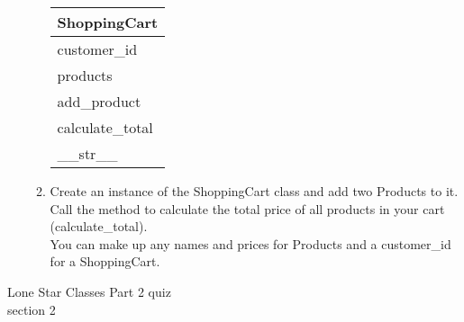 \documentclass{article}
\begin{document}
\begin{enumerate}
\begin{enumerate}
			\begin{flushright}
			\begin{tabular}{|l|}
				\hline
				ShoppingCart\\ \hline  	%
				customer\_id \\ products\\ \hline		%
				add\_product \\ calculate\_total \\ \_\_str\_\_ \\ \hline		%
			\end{tabular}
			\end{flushright}

		\item
			Create an instance of the ShoppingCart class and add two Products to it.\\
			Call the method to calculate the total price of all products in your cart (calculate\_total).\\
			You can make up any names and prices for Products and a customer\_id for a ShoppingCart.\\
	\end{enumerate}
\pagebreak


\end{enumerate}
\pagebreak
Lone Star \hfill Classes Part 2 quiz\\
section 2\\
\end{document}
